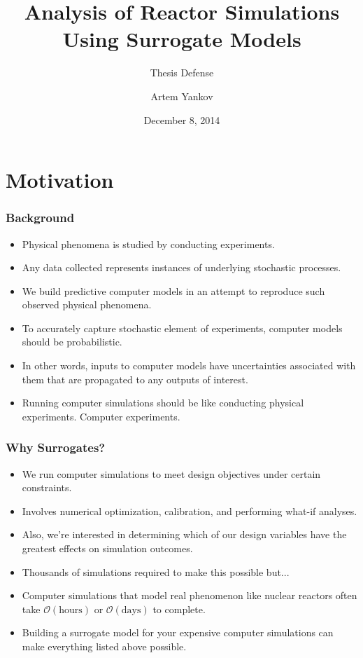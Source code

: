 \documentclass{beamer}
\title[]{Analysis of Reactor Simulations \\ Using Surrogate Models}
\subtitle[]{Thesis Defense}
\author[]{Artem Yankov}
\institute[]{University of Michigan}
\date{December 8, 2014}
\begin{document}
\begin{frame}
\titlepage
\end{frame}

\section{Motivation}

\begin{frame}
\frametitle{Background}

\begin{itemize}
  \item Physical phenomena is studied by conducting experiments. 
  \item Any data collected represents instances of underlying stochastic processes.  
  \item We build predictive computer models in an attempt to reproduce such observed physical phenomena.
  \item To accurately capture stochastic element of experiments, computer models should be probabilistic.  
  \item In other words, inputs to computer models have uncertainties associated with them that are propagated to any outputs of interest.
  \item Running computer simulations should be like conducting physical experiments. Computer experiments.      
\end{itemize}

\end{frame}
\begin{frame}
\frametitle{Why Surrogates?}

\begin{itemize}
  \item We run computer simulations to meet design objectives under certain constraints. 
  \item Involves numerical optimization, calibration, and performing what-if analyses.
  \item Also, we're interested in determining which of our design variables have the greatest effects on simulation outcomes. 
  \item Thousands of simulations required to make this possible but...  
  \item Computer simulations that model real phenomenon like nuclear reactors often take $\mathcal{O}(\mbox{hours})$ or $\mathcal{O}(\mbox{days})$ to complete.
  \item Building a surrogate model for your expensive computer simulations can make everything listed above possible.   
\end{itemize}

\end{frame}
\end{document}
